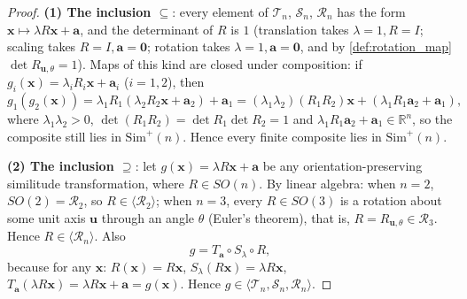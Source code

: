 \begin{proof}
\textbf{(1) The inclusion $\subseteq$}: every element of $\mathcal T_n$, $\mathcal S_n$, $\mathcal R_n$ has the form $\mathbf x\mapsto\lambda R\mathbf x+\mathbf a$, and the determinant of $R$ is $1$ (translation takes $\lambda=1,R=I$; scaling takes $R=I,\mathbf a=\mathbf 0$; rotation takes $\lambda=1,\mathbf a=\mathbf 0$, and by \cref{def:rotation_map} $\det R_{\mathbf u,\theta}=1$). Maps of this kind are closed under composition: if $g_i(\mathbf x)=\lambda_iR_i\mathbf x+\mathbf a_i$ ($i=1,2$), then
\[
g_1(g_2(\mathbf x)) = \lambda_1R_1(\lambda_2R_2\mathbf x+\mathbf a_2)+\mathbf a_1
= (\lambda_1\lambda_2)(R_1R_2)\mathbf x + (\lambda_1R_1\mathbf a_2+\mathbf a_1),
\]
where $\lambda_1\lambda_2>0$, $\det(R_1R_2)=\det R_1\det R_2=1$ and $\lambda_1R_1\mathbf a_2+\mathbf a_1\in\mathbb R^n$, so the composite still lies in $\mathrm{Sim}^{+}(n)$. Hence every finite composite lies in $\mathrm{Sim}^{+}(n)$.

\textbf{(2) The inclusion $\supseteq$}: let $g(\mathbf x)=\lambda R\mathbf x+\mathbf a$ be any orientation-preserving similitude transformation, where $R\in SO(n)$. By linear algebra: when $n=2$, $SO(2)=\mathcal R_2$, so $R\in\langle\mathcal R_2\rangle$; when $n=3$, every $R\in SO(3)$ is a rotation about some unit axis $\mathbf u$ through an angle $\theta$ (Euler's theorem), that is, $R=R_{\mathbf u,\theta}\in\mathcal R_3$. Hence $R\in\langle\mathcal R_n\rangle$. Also
\[
g = T_{\mathbf a}\circ S_\lambda\circ R,
\]
because for any $\mathbf x$: $R(\mathbf x)=R\mathbf x$, $S_\lambda(R\mathbf x)=\lambda R\mathbf x$, $T_{\mathbf a}(\lambda R\mathbf x)=\lambda R\mathbf x+\mathbf a=g(\mathbf x)$. Hence $g\in\langle\mathcal T_n,\mathcal S_n,\mathcal R_n\rangle$.
\end{proof}

